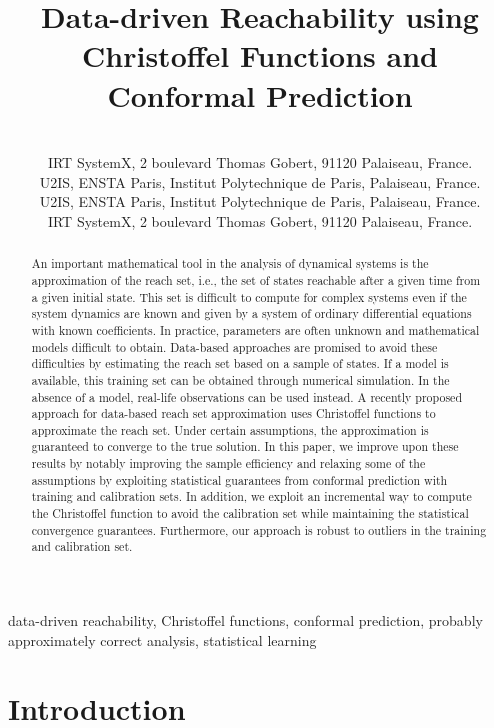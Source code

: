 \documentclass[pmlr]{jmlr}%
\title[Data-driven Reachability using Christoffel Functions]{Data-driven Reachability using Christoffel Functions and Conformal Prediction}
\author{\Name{Abdelmouaiz Tebjou} \Email{abdelmouaiz.tebjou@irt-systemx.fr}\\
\addr IRT SystemX, 2 boulevard Thomas Gobert, 91120 Palaiseau, France.\\
\addr U2IS, ENSTA Paris, Institut Polytechnique de Paris, Palaiseau, France.
\AND
\Name{Goran Frehse} 
\Email{goran.frehse@ensta-paris.fr}\\
\addr U2IS, ENSTA Paris, Institut Polytechnique de Paris, Palaiseau, France.%
\AND
\Name{Fa\"icel Chamroukhi}
\Email{faicel.chamroukhi@irt-systemx.fr}\\
\addr IRT SystemX, 2 boulevard Thomas Gobert, 91120 Palaiseau, France.
}
\begin{document}
\maketitle

\begin{abstract}
An important mathematical tool in the analysis of dynamical systems is the approximation of the reach set, i.e., the set of states reachable after a given time from a given initial state. This set is difficult to compute for complex systems even if the system dynamics are known and given by a system of ordinary differential equations with known coefficients. In practice, parameters are often unknown and mathematical models difficult to obtain. Data-based approaches are promised to avoid these difficulties by estimating the reach set based on a sample of states. If a model is available, this training set can be obtained through numerical simulation. In the absence of a model, real-life observations can be used instead. 
A recently proposed approach for data-based reach set approximation uses Christoffel functions to approximate the reach set. 
Under certain assumptions, the approximation is guaranteed to converge to the true solution. In this paper, we improve upon these results by notably improving the sample efficiency and relaxing some of the assumptions by exploiting statistical guarantees from conformal prediction with training and calibration sets. 
In addition, we exploit an incremental way to compute the Christoffel function to avoid the calibration set while maintaining the statistical convergence guarantees.
Furthermore, our approach is robust to outliers in the training and calibration set.
\end{abstract}
\begin{keywords}
data-driven reachability, 
Christoffel functions,
conformal prediction,
probably approximately correct analysis,
statistical learning
\end{keywords}


\section{Introduction}
\label{sec:intro}
\end{document}
